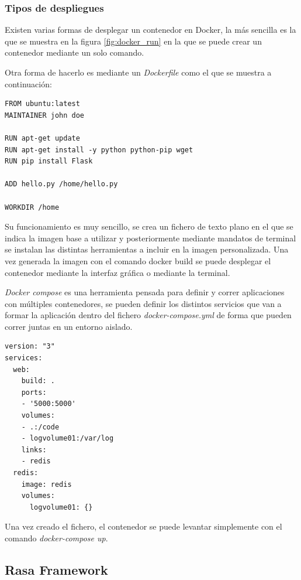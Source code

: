 \subsubsection{Tipos de despliegues}
Existen varias formas de desplegar un contenedor en Docker, la más sencilla es la que se muestra en la figura \ref{fig:docker_run} en la que se puede crear un contenedor mediante un solo comando. 

Otra forma de hacerlo es mediante un \textit{Dockerfile} como el que se muestra a continuación:

\begin{lstlisting}
FROM ubuntu:latest
MAINTAINER john doe 

RUN apt-get update
RUN apt-get install -y python python-pip wget
RUN pip install Flask

ADD hello.py /home/hello.py

WORKDIR /home
\end{lstlisting}

Su funcionamiento es muy sencillo, se crea un fichero de texto plano en el que se indica la imagen base a utilizar y posteriormente mediante mandatos de terminal se instalan las distintas herramientas a incluir en la imagen personalizada. Una vez generada la imagen con el comando docker build se puede desplegar el contenedor mediante la interfaz gráfica o mediante la terminal.

\textit{Docker compose} es una herramienta pensada para definir y correr aplicaciones con múltiples contenedores, se pueden definir los distintos servicios que van a formar la aplicación dentro del fichero \textit{docker-compose.yml} de forma que pueden correr juntas en un entorno aislado.

\vspace{.7cm}
\begin{lstlisting}
version: "3"
services:
  web:
    build: .
    ports:
    - '5000:5000'
    volumes:
    - .:/code
    - logvolume01:/var/log
    links:
    - redis
  redis:
    image: redis
    volumes:
      logvolume01: {}
\end{lstlisting}

Una vez creado el fichero, el contenedor se puede levantar simplemente con el comando \textit{docker-compose up}.

\subsection{Rasa Framework}